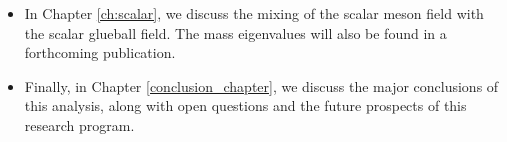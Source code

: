 \begin{itemize}
\item In Chapter \ref{ch:scalar}, we discuss the mixing of the scalar meson field with the scalar glueball field. 
The mass eigenvalues will also be found in a forthcoming publication.

\item Finally, in Chapter \ref{conclusion_chapter}, we discuss the major conclusions of this analysis, along with open questions and the future prospects of this research program.


\end{itemize}
